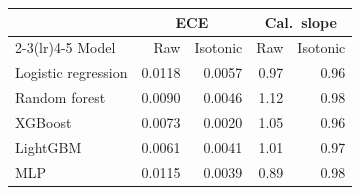 \begin{tabular}{@{}lrrrr@{}}
\toprule
 & \multicolumn{2}{c}{ECE} & \multicolumn{2}{c}{Cal.\ slope} \\
\cmidrule(lr){2-3}\cmidrule(lr){4-5}
Model & Raw & Isotonic & Raw & Isotonic \\
\midrule
Logistic regression & 0.0118 & 0.0057 & 0.97 & 0.96 \\
Random forest & 0.0090 & 0.0046 & 1.12 & 0.98 \\
XGBoost & 0.0073 & 0.0020 & 1.05 & 0.96 \\
LightGBM & 0.0061 & 0.0041 & 1.01 & 0.97 \\
MLP & 0.0115 & 0.0039 & 0.89 & 0.98 \\
\bottomrule
\end{tabular}

